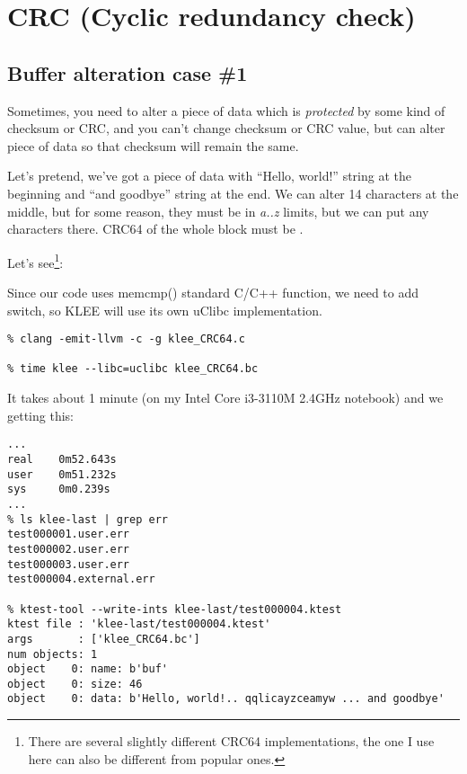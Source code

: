 \section{CRC (Cyclic redundancy check)}

\renewcommand{\CURPATH}{CRC/KLEE}

\subsection{Buffer alteration case \#1}

Sometimes, you need to alter a piece of data which is \textit{protected} by some kind of checksum or \ac{CRC}, and you can't change checksum or CRC value, but can alter piece of data so that checksum will remain the same.

Let's pretend, we've got a piece of data with ``Hello, world!'' string at the beginning and ``and goodbye'' string at the end.
We can alter 14 characters at the middle, but for some reason, they must be in \textit{a..z} limits, but we can put any characters there.
CRC64 of the whole block must be .

Let's see\footnote{There are several slightly different CRC64 implementations, the one I use here can also be different from popular ones.}:



Since our code uses memcmp() standard C/C++ function, we need to add  switch, so KLEE will use its own uClibc 
implementation. %

\begin{lstlisting}
% clang -emit-llvm -c -g klee_CRC64.c

% time klee --libc=uclibc klee_CRC64.bc
\end{lstlisting}

It takes about 1 minute (on my Intel Core i3-3110M 2.4GHz notebook) and we getting this:

\begin{lstlisting}
...
real    0m52.643s
user    0m51.232s
sys     0m0.239s
...
% ls klee-last | grep err
test000001.user.err
test000002.user.err
test000003.user.err
test000004.external.err

% ktest-tool --write-ints klee-last/test000004.ktest
ktest file : 'klee-last/test000004.ktest'
args       : ['klee_CRC64.bc']
num objects: 1
object    0: name: b'buf'
object    0: size: 46
object    0: data: b'Hello, world!.. qqlicayzceamyw ... and goodbye'
\end{lstlisting}

